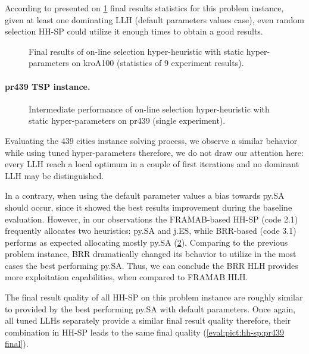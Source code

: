 According to presented on \cref{eval:pict:hh-sp:kroA100 final} final results statistics for this problem instance, given at least one dominating LLH (default parameters values case), even random selection HH-SP could utilize it enough times to obtain a good results.

\begin{figure}[b]
	\centering
	\vspace{-20pt}
	
	\caption{Final results of on-line selection hyper-heuristic with static hyper-parameters on kroA100 (statistics of 9 experiment results).}
	\vspace{-5pt}
	\label{eval:pict:hh-sp:kroA100 final}
\end{figure}

\newpage
\paragraph{pr439 TSP instance.}
\begin{figure}[t]
	\centering
	\vspace{-20pt}
	
	\caption{Intermediate performance of on-line selection hyper-heuristic with static hyper-parameters on pr439 (single experiment).}
	\vspace{-10pt}
	\label{eval:pict:hh-sp:pr439 intermediate}
\end{figure}
Evaluating the 439 cities instance solving process, we observe a similar behavior while using tuned hyper-parameters therefore, we do not draw our attention here: every LLH reach a local optimum in a couple of first iterations and no dominant LLH may be distinguished.

In a contrary, when using the default parameter values a bias towards py.SA should occur, since it showed the best results improvement during the baseline evaluation. However, in our observations the FRAMAB-based HH-SP (code 2.1) frequently allocates two heuristics: py.SA and j.ES, while BRR-based (code 3.1) performs as expected allocating mostly py.SA (\cref{eval:pict:hh-sp:pr439 intermediate}). Comparing to the previous problem instance, BRR dramatically changed its behavior to utilize in the most cases the best performing py.SA. Thus, we can conclude the BRR HLH provides more exploitation capabilities, when compared to FRAMAB HLH.

The final result quality of all HH-SP on this problem instance are roughly similar to provided by the best performing py.SA with default parameters. Once again, all tuned LLHs separately provide a similar final result quality therefore, their combination in HH-SP leads to the same final quality (\cref{eval:pict:hh-sp:pr439 final}).

